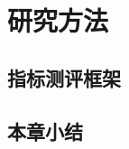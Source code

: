 
\chapter{研究方法}\label{ch:method}

\section{指标测评框架}\label{sec:eval_framework}

\section{本章小结}\label{sec:method_conclusion}
